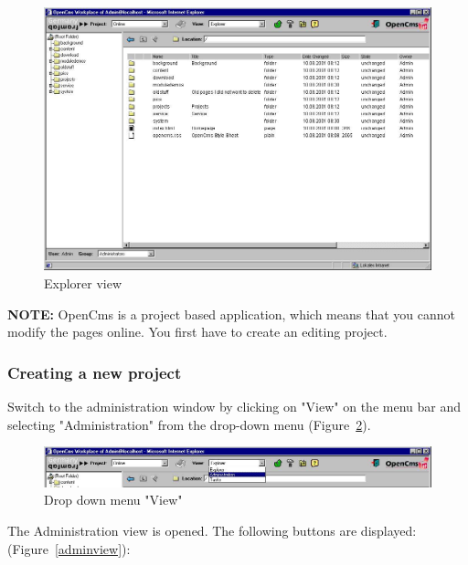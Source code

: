 \begin{figure}[hbt]
\begin{center}
\includegraphics[width=\sgw]
                   {pics/usermanual/explorer}
\caption[Explorer view]
           {Explorer view}
\label{explorer}
\end{center}
\end{figure}

\textbf{NOTE:} OpenCms is a project based application, which means
that you cannot modify the pages online. You first have to create
an editing project.

\subsubsection{Creating a new project}

Switch to the administration window by clicking on "View" on the
menu bar and selecting "Administration" from the drop-down menu
(Figure~\ref{view}).

\begin{figure}[hbt]
\begin{center}
\includegraphics[width=\sgw]
                   {pics/usermanual/view}
\caption[Drop down menu "View"]
           {Drop down menu "View"}
\label{view}
\end{center}
\end{figure}

The Administration view is opened. The following buttons are
displayed: (Figure~\ref{adminview}):

